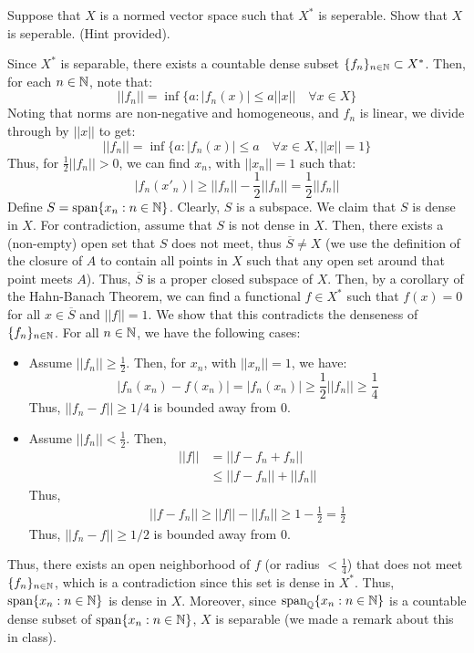 \documentclass[12pt]{article}
\begin{document}
\begin{problem}{41}
    Suppose that $X$ is a normed vector space such that $X^*$ is seperable. Show that $X$ is seperable. (Hint provided).
\end{problem}
\begin{solution} 
    Since $X^*$ is separable, there exists a countable dense subset $\{f_n\}_{n \in \mathbb N} \subset X^*$. Then, for each $n \in \mathbb N$, note that: 
    \[ ||f_n|| = \inf\{a : |f_n(x)| \leq a||x|| \quad \forall x \in X\}\]
    Noting that norms are non-negative and homogeneous, and $f_n$ is linear, we divide through by $||x||$ to get: 
    \[ ||f_n|| = \inf\{a : |f_n(x)| \leq a \quad \forall x \in X, ||x|| = 1\}\]
    Thus, for $\frac{1}{2}||f_n|| > 0$, we can find $x_n$, with $||x_n||=1$ such that:
    \[|f_n(x'_n)| \geq ||f_n|| - \frac{1}{2}||f_n|| = \frac{1}{2} ||f_n|| \] 
    Define $S = \operatorname{span}\{x_n : n \in \mathbb N\}$. Clearly, $S$ is a subspace. We claim that $S$ is dense in $X$. \bbni
    For contradiction, assume that $S$ is not dense in $X$. Then, there exists a (non-empty) open set that $S$ does not meet, thus $\overline{S} \neq X$ (we use the definition of the closure of $A$ to contain all points in $X$ such that any open set around that point meets $A$). Thus, $\overline{S}$ is a proper closed subspace of $X$. \bbni
    Then, by a corollary of the Hahn-Banach Theorem, we can find a functional $f \in X^*$ such that $f(x) = 0$ for all $x \in \overline{S}$ and $||f|| = 1$. We show that this contradicts the denseness of $\{f_n\}_{n \in \mathbb N}$. \bbni
    For all $n \in \mathbb N$, we have the following cases: 
    \begin{itemize}
        \item Assume $||f_n|| \geq \frac{1}{2}$. Then, for $x_n$, with $||x_n|| = 1$, we have:
        \[|f_n(x_n)-f(x_n)| = |f_n(x_n)| \geq \frac12||f_n|| \geq \frac{1}{4}\]
        Thus, $||f_n-f|| \geq 1/4$ is bounded away from $0$.
        \item Assume $||f_n|| < \frac{1}{2}$. Then, 
        \begin{align*}
            ||f|| &= ||f-f_n+f_n||  \\
            &\leq ||f-f_n|| + ||f_n||
        \end{align*}
        Thus, 
        \begin{align*}
            ||f-f_n|| \geq ||f|| - ||f_n|| \geq 1-\frac12 = \frac12
        \end{align*}        
        Thus, $||f_n-f|| \geq 1/2$ is bounded away from $0$. 
    \end{itemize}
    Thus, there exists an open neighborhood of $f$ (or radius $< \frac14$) that does not meet $\{f_n\}_{n\in\mathbb N}$, which is a contradiction since this set is dense in $X^*$.\bbni
    Thus, $\operatorname{span}\{x_n : n \in \mathbb N\}$ is dense in $X$. Moreover, since $\operatorname{span}_\mathbb Q\{x_n : n \in \mathbb N\}$ is a countable dense subset of $\operatorname{span}\{x_n : n \in \mathbb N\}$, $X$ is separable (we made a remark about this in class).
\end{solution}
\newpage 
\end{document}
